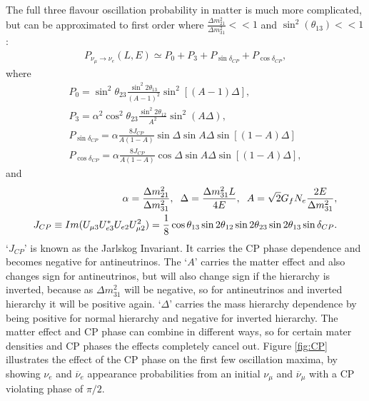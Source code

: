 \documentclass[12pt]{article}
\begin{document}
The full three flavour oscillation probability in matter is much more complicated, but can be approximated to first order\cite{analytic} where $\frac{\Delta m_{21}^2}{\Delta m_{31}^2}<<1$ and $\sin^2(\theta_{13})<<1$:
\begin{align}
\label{eq:P}
P_{\nu_{\mu}\rightarrow \nu_{e}}(L,E)\simeq P_0 + P_3 + P_{\sin \delta_{CP}} + P_{\cos \delta_{CP}},
\end{align}
where
\begin{align}
P_0=\sin^2{\theta_{23}}\frac{\sin^2{2\theta_{13}}}{(A-1)^2}\sin^2[(A-1)\Delta],\\
P_3=\alpha^2\cos^2{\theta_{23}}\frac{\sin^2{2\theta_{12}}}{A^2}\sin^2(A\Delta),\\
P_{\sin \delta_{CP}}=\alpha\frac{8J_{CP}}{A(1-A)} \sin{\Delta} \sin{A\Delta}\sin[(1-A)\Delta]\\
P_{\cos \delta_{CP}}=\alpha\frac{8J_{CP}}{A(1-A)} \cos{\Delta} \sin{A \Delta}\sin[(1-A)\Delta],
\end{align}
and
\begin{align}
\alpha = \frac{\Delta m_{21}^2}{\Delta m_{31}^2},\hspace{2mm} \Delta = \frac{\Delta m_{31}^2L}{4E},\hspace{2mm} A=\sqrt{2}G_f N_e \frac{2E}{\Delta m_{31}^2},\\
\label{eq:J}
J_{CP}\equiv Im(U_{\mu 3}U_{e 3}^*U_{e 2}U_{\mu 2}^2)=\frac{1}{8}\cos \theta_{13}\sin 2\theta_{12}\sin 2\theta_{23}\sin 2\theta_{13}\sin \delta_{CP}.
\end{align}
`$J_{CP}$' is known as the Jarlskog Invariant. It carries the CP phase dependence and becomes negative for antineutrinos. The `$A$' carries the matter effect and also changes sign for antineutrinos, but will also change sign if the hierarchy is inverted, because as $\Delta m_{31}^2$ will be negative, so for antineutrinos and inverted hierarchy it will be positive again. `$\Delta$' carries the mass hierarchy dependence by being positive for normal hierarchy and negative for inverted hierarchy. The matter effect and CP phase can combine in different ways, so for certain mater densities and CP phases the effects completely cancel out. Figure \ref{fig:CP} illustrates the effect of the CP phase on the first few oscillation maxima, by showing $\nu_e$ and $\overline{\nu}_e$ appearance probabilities from an initial $\nu_{\mu}$ and $\overline{\nu}_{\mu}$ with a CP violating phase of $\pi/2$.
\end{document}
